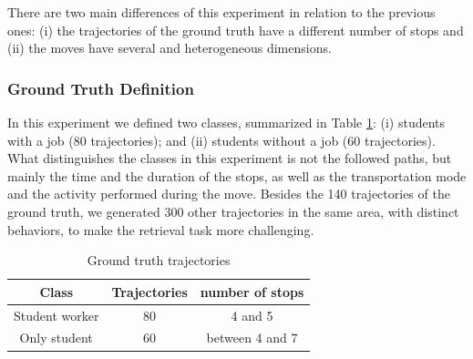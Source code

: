 \documentclass[12pt]{article}
\begin{document}
There are two main differences of this experiment in relation to the previous ones: (i) the trajectories of the ground truth have a different number of stops and (ii) the moves have several and heterogeneous dimensions.

\subsubsection{Ground Truth Definition}
In this experiment we defined two classes, summarized in Table \ref{tab:hermoupolis_dataset}: (i) students with a job (80 trajectories); and (ii) students without a job (60 trajectories). What distinguishes the classes in this experiment is not the followed paths, but mainly the time and the duration  of the stops, as well as the transportation mode and the activity performed during the move. Besides the 140 trajectories of the ground truth, we generated 300 other trajectories in the same area, with distinct behaviors, to make the retrieval task more challenging.

\begin{table}[ht!]
\scriptsize
  \centering
  \begin{tabular}{|c|c|c|}
  	\hline
  Class & Trajectories & number of stops \\
  	\hline
Student worker & 80 & 4 and 5 \\
Only student & 60 & between 4 and 7 \\
    \hline
  \end{tabular}
  \caption{Ground truth trajectories}
  \label{tab:hermoupolis_dataset}
\end{table}
\end{document}
